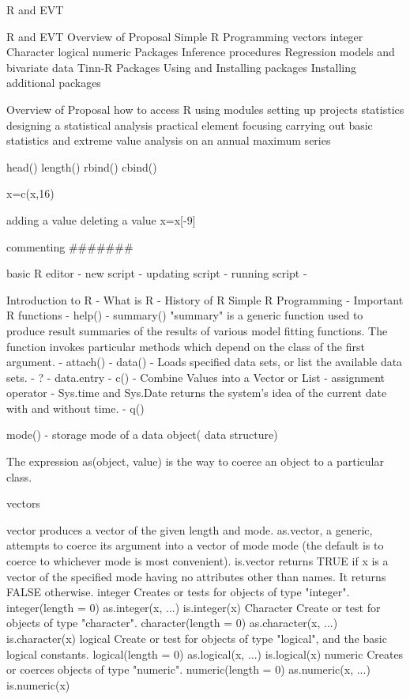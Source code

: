 \documentclass[a4paper,12pt]{article}
\begin{document}
\tableofcontents


R and EVT

R and EVT
Overview of Proposal
Simple R Programming
vectors
integer
Character
logical
numeric
Packages
Inference procedures
Regression models and bivariate data
Tinn-R
Packages
Using and Installing packages
Installing additional packages

Overview of Proposal
how to access R
using modules
setting up projects
statistics
designing a statistical analysis
practical element focusing carrying out basic statistics and extreme value analysis on an annual maximum series
 
 
head()
length()
rbind()
cbind()

x=c(x,16)

adding a value
deleting a value
x=x[-9]

commenting #######


basic R editor
 - new script
 - updating script
 - running script
 -

Introduction to R
 - What is R
 - History of R
Simple R Programming
 - Important R functions
  - help()
  - summary()
"summary" is a generic function used to produce result summaries of the results of various model fitting functions. 
The function invokes particular methods which depend on the class of the first argument. 
  - attach()
  - data()
   - Loads specified data sets, or list the available data sets. 
  - ?
  - data.entry
  - c()
- Combine Values into a Vector or List
  - assignment operator
  - Sys.time and Sys.Date returns the system's idea of the current date with and without time. 
  - q()


mode() - storage mode of a data object( data structure)

The expression as(object, value) is the way to coerce an object to a particular class. 

vectors

vector produces a vector of the given length and mode.
as.vector, a generic, attempts to coerce its argument into a vector of mode mode (the default is to coerce to whichever mode is most convenient).
is.vector returns TRUE if x is a vector of the specified mode having no attributes other than names. It returns FALSE otherwise.  
integer
Creates or tests for objects of type "integer".
integer(length = 0)
as.integer(x, ...)
is.integer(x)
 Character
Create or test for objects of type "character".
character(length = 0)
as.character(x, ...)
is.character(x)
logical
Create or test for objects of type "logical", and the basic logical constants.
logical(length = 0)
as.logical(x, ...)
is.logical(x)
numeric
Creates or coerces objects of type "numeric". 
numeric(length = 0)
as.numeric(x, ...)
is.numeric(x)
\end{document}
